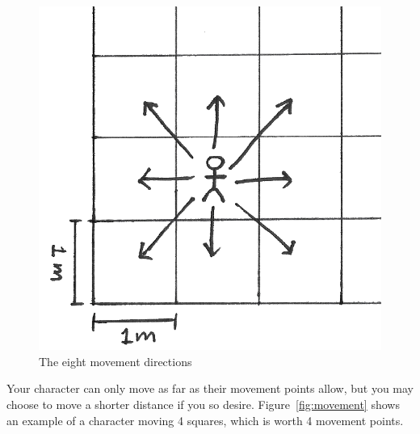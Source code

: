 \begin{figure}
    \centering
    \includegraphics{graphics/directions-trans.png}
    \caption{The eight movement directions}
    \label{fig:directions}
\end{figure}

Your character can only move as far as their movement points allow, but you may choose to move a shorter distance if you so desire.
Figure~\ref{fig:movement} shows an example of a character moving 4 squares, which is worth 4 movement points.

